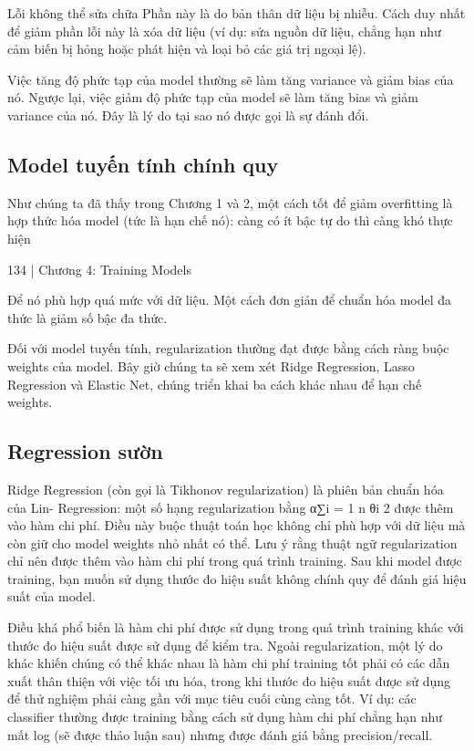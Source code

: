 Lỗi không thể sửa chữa Phần này là do bản thân dữ liệu bị nhiễu. Cách duy nhất để giảm phần lỗi này là xóa dữ liệu (ví dụ: sửa nguồn dữ liệu, chẳng hạn như cảm biến bị hỏng hoặc phát hiện và loại bỏ các giá trị ngoại lệ).

Việc tăng độ phức tạp của model thường sẽ làm tăng variance và giảm bias của nó. Ngược lại, việc giảm độ phức tạp của model sẽ làm tăng bias và giảm variance của nó. Đây là lý do tại sao nó được gọi là sự đánh đổi.

\subsection{Model tuyến tính chính quy}

Như chúng ta đã thấy trong Chương 1 và 2, một cách tốt để giảm overfitting là hợp thức hóa model (tức là hạn chế nó): càng có ít bậc tự do thì càng khó thực hiện

134 | Chương 4: Training Models

Để nó phù hợp quá mức với dữ liệu. Một cách đơn giản để chuẩn hóa model đa thức là giảm số bậc đa thức.

Đối với model tuyến tính, regularization thường đạt được bằng cách ràng buộc weights của model. Bây giờ chúng ta sẽ xem xét Ridge Regression, Lasso Regression và Elastic Net, chúng triển khai ba cách khác nhau để hạn chế weights.

\subsection{Regression sườn}

Ridge Regression (còn gọi là Tikhonov regularization) là phiên bản chuẩn hóa của Lin- Regression: một số hạng regularization bằng α∑i = 1 n θi 2 được thêm vào hàm chi phí. Điều này buộc thuật toán học không chỉ phù hợp với dữ liệu mà còn giữ cho model weights nhỏ nhất có thể. Lưu ý rằng thuật ngữ regularization chỉ nên được thêm vào hàm chi phí trong quá trình training. Sau khi model được training, bạn muốn sử dụng thước đo hiệu suất không chính quy để đánh giá hiệu suất của model.

Điều khá phổ biến là hàm chi phí được sử dụng trong quá trình training khác với thước đo hiệu suất được sử dụng để kiểm tra. Ngoài regularization, một lý do khác khiến chúng có thể khác nhau là hàm chi phí training tốt phải có các dẫn xuất thân thiện với việc tối ưu hóa, trong khi thước đo hiệu suất được sử dụng để thử nghiệm phải càng gần với mục tiêu cuối cùng càng tốt. Ví dụ: các classifier thường được training bằng cách sử dụng hàm chi phí chẳng hạn như mất log (sẽ được thảo luận sau) nhưng được đánh giá bằng precision/recall.


